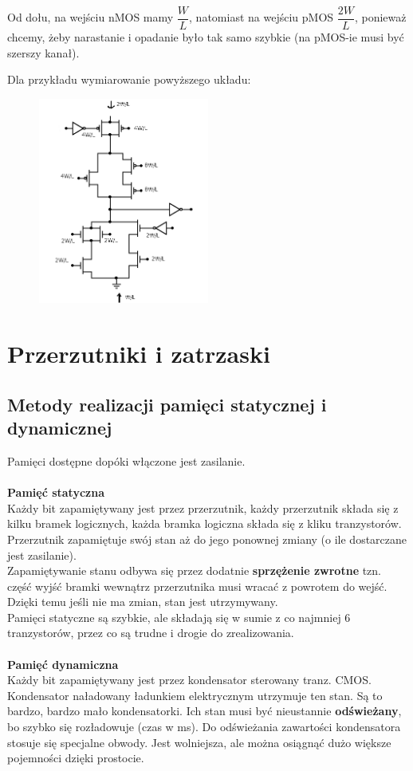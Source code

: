 \documentclass[10pt,a4paper]{article}
\begin{document}
Od dołu, na wejściu nMOS mamy $\dfrac{W}{L}$, natomiast na wejściu pMOS $\dfrac{2W}{L}$, ponieważ chcemy, żeby narastanie i opadanie było tak samo szybkie (na pMOS-ie musi być szerszy kanał).

Dla przykładu wymiarowanie powyższego układu:
\begin{figure}[H]
\centering
\includegraphics[width=0.5\textwidth]{F_wymiar.png}
\end{figure}

\section{Przerzutniki i zatrzaski}

\subsection{Metody realizacji pamięci statycznej i dynamicznej}
Pamięci dostępne dopóki włączone jest zasilanie.\\
\\
\textbf{Pamięć statyczna} \\
Każdy bit zapamiętywany jest przez przerzutnik, każdy przerzutnik składa się z kilku bramek logicznych, każda bramka logiczna składa się z kliku tranzystorów. Przerzutnik zapamiętuje swój stan aż do jego ponownej zmiany (o ile dostarczane jest zasilanie).\\
Zapamiętywanie stanu odbywa się przez dodatnie \textbf{sprzężenie zwrotne} tzn. część wyjść bramki wewnątrz przerzutnika musi wracać z powrotem do wejść. Dzięki temu jeśli nie ma zmian, stan jest utrzymywany.\\
Pamięci statyczne są szybkie, ale składają się w sumie z co najmniej 6 tranzystorów, przez co są trudne i drogie do zrealizowania. \\
\\
\textbf{Pamięć dynamiczna} \\
Każdy bit zapamiętywany jest przez kondensator sterowany tranz. CMOS. Kondensator naładowany ładunkiem elektrycznym utrzymuje ten stan. Są to bardzo, bardzo mało kondensatorki. Ich stan musi być nieustannie \textbf{odświeżany}, bo szybko się rozładowuje (czas w ms).  Do odświeżania zawartości kondensatora stosuje się specjalne obwody. Jest wolniejsza, ale można osiągnąć dużo większe pojemności dzięki prostocie.
\end{document}
